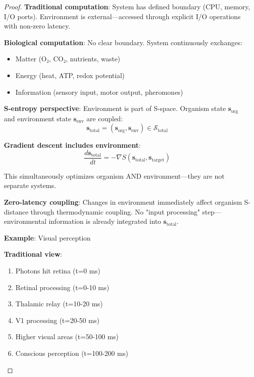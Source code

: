 \begin{proof}
\textbf{Traditional computation}: System has defined boundary (CPU, memory, I/O ports). Environment is external—accessed through explicit I/O operations with non-zero latency.

\textbf{Biological computation}: No clear boundary. System continuously exchanges:
\begin{itemize}
\item Matter (O₂, CO₂, nutrients, waste)
\item Energy (heat, ATP, redox potential)
\item Information (sensory input, motor output, pheromones)
\end{itemize}

\textbf{S-entropy perspective}: Environment is part of S-space. Organism state $\mathbf{s}_{\text{org}}$ and environment state $\mathbf{s}_{\text{env}}$ are coupled:
\begin{equation}
\mathbf{s}_{\text{total}} = (\mathbf{s}_{\text{org}}, \mathbf{s}_{\text{env}}) \in \mathcal{S}_{\text{total}}
\end{equation}

\textbf{Gradient descent includes environment}:
\begin{equation}
\frac{d\mathbf{s}_{\text{total}}}{dt} = -\nabla S(\mathbf{s}_{\text{total}}, \mathbf{s}_{\text{target}})
\end{equation}

This simultaneously optimizes organism AND environment—they are not separate systems.

\textbf{Zero-latency coupling}: Changes in environment immediately affect organism S-distance through thermodynamic coupling. No "input processing" step—environmental information is already integrated into $\mathbf{s}_{\text{total}}$.

\textbf{Example}: Visual perception

\textbf{Traditional view}: 
\begin{enumerate}
\item Photons hit retina (t=0 ms)
\item Retinal processing (t=0-10 ms)
\item Thalamic relay (t=10-20 ms)
\item V1 processing (t=20-50 ms)
\item Higher visual areas (t=50-100 ms)
\item Conscious perception (t=100-200 ms)
\end{enumerate}


\end{proof}
